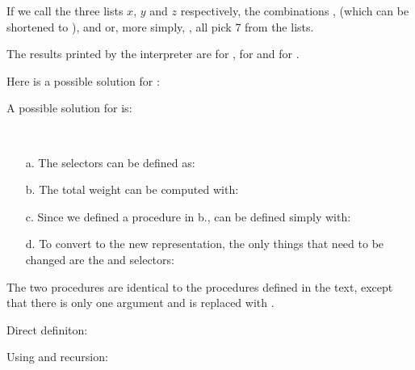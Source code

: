 \begin{exe}[2.25]
    If we call the three lists $x$, $y$ and $z$ respectively, the combinations 
    ,  (which can be 
    shortened to ), and\linebreak
    or, more simply,
    ,
    all pick 7 from the lists.
\end{exe}

\begin{exe}[2.26]
    The results printed by the interpreter are  for
    ,  for  and
     for .
\end{exe}

\begin{exe}[2.27]
    Here is a possible solution for :
\end{exe}

\begin{exe}[2.28]
    A possible solution for  is:
\end{exe}

\begin{exe}[2.29]
    \ \vspace{-20pt}
    \begin{itemize}
        \item[a.] The selectors can be defined as:
        \item[b.] The total weight can be computed with:
        \item[c.] Since we defined a  procedure in b., 
             can be defined simply with:
        \item[d.] To convert to the new representation, the only things that 
            need to be changed are the  and 
             selectors:
    \end{itemize}
\end{exe}

\begin{exe}[2.30]
    The two  procedures are identical to the  
    procedures defined in the text, except that there is only one argument and 
     is replaced with .

    Direct definiton:

    Using  and recursion:
\end{exe}

